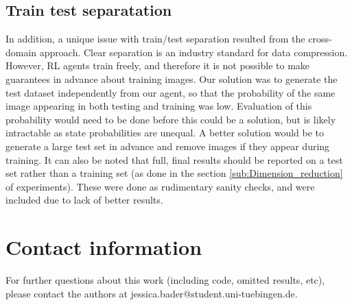 \subsection{Train test separatation}
In addition, a unique issue with train/test separation resulted from the
cross-domain approach. Clear separation is an industry standard for data
compression. However, RL agents train freely, and therefore it is not
possible to make guarantees in advance about training images. Our solution was to generate the test dataset independently from our agent,
so that the probability of the same image appearing in both testing and training
was low. Evaluation of this probability would need to be done before this could
be a solution, but is likely intractable as state probabilities are unequal. A
better solution would be to generate a large test set in advance and remove
images if they appear during training. It can also be noted that full, final
results should be reported on a test set rather than a training set (as done in
the section \ref{sub:Dimension_reduction} of experiments). These were done as rudimentary
sanity checks, and were included due to lack of better results.
\section{Contact information}
For further questions about this work (including code, omitted results, etc), please contact the authors at jessica.bader@student.uni-tuebingen.de.